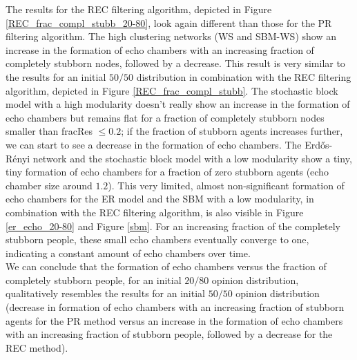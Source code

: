 \documentclass[11 pt , letterpaper , twoside , openright]{book}
\begin{document}
The results for the REC filtering algorithm, depicted in Figure \ref{REC_frac_compl_stubb_20-80}, look again different than those for the PR filtering algorithm. The high clustering networks (WS and SBM-WS) show an increase in the formation of echo chambers with an increasing fraction of completely stubborn nodes, followed by a decrease. This result is very similar to the results for an initial $50/50$ distribution in combination with the REC filtering algorithm, depicted in Figure \ref{REC_frac_compl_stubb}. The stochastic block model with a high modularity doesn't really show an increase in the formation of echo chambers but remains flat for a fraction of completely stubborn nodes smaller than fracRes $\leqslant 0.2$; if the fraction of stubborn agents increases further, we can start to see a decrease in the formation of echo chambers. The Erd\H{o}s-R\'{e}nyi network and the stochastic block model with a low modularity show a tiny, tiny formation of echo chambers for a fraction of zero stubborn agents (echo chamber size around $1.2$). This very limited, almost non-significant formation of echo chambers for the ER model and the SBM with a low modularity, in combination with the REC filtering algorithm, is also visible in Figure \ref{er_echo_20-80} and Figure \ref{sbm}. For an increasing fraction of the completely stubborn people, these small echo chambers eventually converge to one, indicating a constant amount of echo chambers over time.\\
We can conclude that the formation of echo chambers versus the fraction of completely stubborn people, for an initial $20/80$ opinion distribution, qualitatively resembles the results for an initial $50/50$ opinion distribution (decrease in formation of echo chambers with an increasing fraction of stubborn agents for the PR method versus an increase in the formation of echo chambers with an increasing fraction of stubborn people, followed by a decrease for the REC method). 
\end{document}
